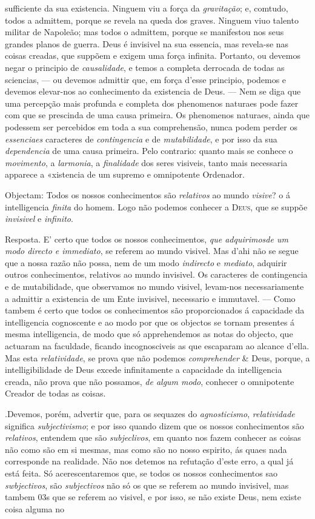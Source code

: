 sufficiente da sua existencia. Ninguem viu a força da \emph{gravitação}; e, comtudo, todos a admittem, porque se revela na queda dos graves. Ninguem viuo talento militar de Napoleão; mas todos o admittem, porque se manifestou nos seus grandes planos de guerra. Deus é invisivel na sua essencia, mas revela-se nas coisas creadas, que suppõem e exigem uma força infinita. Portanto, ou devemos negar o principio de \emph{causalidade}, e temos a completa derrocada de todas as sciencias, --- ou devemos admittir que, em força d'esse principio, podemos e devemos elevar-nos ao conhecimento da existencia de Deus. --- Nem se diga que uma percepção mais profunda e completa dos phenomenos naturaes pode fazer com que se prescinda de uma causa primeira. Os phenomenos naturaes, ainda que podessem ser percebidos em toda a sua comprehensão, nunca podem perder os \emph{essenciaes} caracteres de \emph{contingencia} e de \emph{mutabilidade}, e por isso da sua \emph{dependencia} de uma causa primeira. Pelo contrario: quanto mais se conhece o \emph{movimento}, a \emph{larmonia}, a \emph{finalidade} dos seres visiveis, tanto mais necessaria apparece a «xistencia de um supremo e omnipotente Ordenador.\par Objectam: Todos os nossos conhecimentos são \emph{relativos} ao mundo \emph{visive}? o á intelligencia \emph{finita} do homem. Logo não podemos conhecer a \textsc{Deus}, que se suppõe \emph{invisivel} e \emph{infinito}.\par Resposta. E' certo que todos os nossos conhecimentos, \emph{que adquirimos}\emph{de um modo directo e immediato}, se referem ao mundo visivel. Mas d'ahi não se segue que a nossa razão não possa, nem de um modo \emph{indirecto} e \emph{mediato}, adquirir outros conhecimentos, relativos ao mundo invisivel. Os caracteres de contingencia e de mutabilidade, que observamos no mundo visivel, levam-nos necessariamente a admittir a existencia de um Ente invisivel, necessario e immutavel. --- Como tambem é certo que todos os conhecimentos são proporcionados á capacidade da intelligencia cognoscente e ao modo por que os objectos se tornam presentes á mesma intelligencia, de modo que só apprehendemos as notas do objecto, que actuaram na faculdade, ficando incognosciveis as que escaparam ao alcance d'ella. Mas esta \emph{relatividade}, se prova que não podemos \emph{comprehender} \& Deus, porque, a intelligibilidade de Deus excede infinitamente a capacidade da intelligencia creada, não prova que não possamos, \emph{de algum modo}, conhecer o omnipotente Creador de todas as coisas.\par .Devemos, porém, advertir que, para os sequazes do \emph{agnosticismo}, \emph{relatividade} significa \emph{subjectivismo}; e por isso quando dizem que os nossos conhecimentos são \emph{relativos}, entendem que são \emph{subjeclivos}, em quanto nos fazem conhecer as coisas não como são em si mesmas, mas como são no nosso espirito, ás quaes nada corresponde na realidade. Não nos detemos na refutação d'este erro, a qual já está feita. Só acerescentaremos que, se todos os nossos conhecimentos sao \emph{swbjectivos}, são \emph{subjectivos} não só os que se referem ao mundo invisivel, mas tambem 03s que se referem ao visivel, e por isso, se não existe Deus, nem existe coisa alguma no 